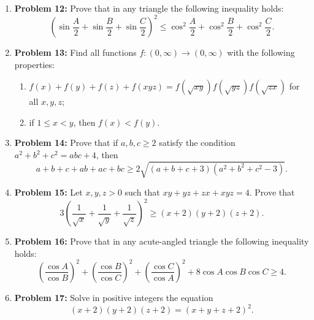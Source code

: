 \documentclass{article}
\begin{document}
\begin{enumerate}
    \vspace{3cm}
    
    \item \textbf{Problem 12:} Prove that in any triangle the following inequality holds:
    \[
    \left( \sin \frac{A}{2} + \sin \frac{B}{2} + \sin \frac{C}{2} \right)^2 \leq \cos^2 \frac{A}{2} + \cos^2 \frac{B}{2} + \cos^2 \frac{C}{2}.
    \]
    
    \vspace{3cm}
    
    \item \textbf{Problem 13:} Find all functions \( f : (0, \infty) \rightarrow (0, \infty) \) with the following properties:
    \begin{enumerate}
        \item \( f(x) + f(y) + f(z) + f(xyz) = f(\sqrt{xy})f(\sqrt{yz})f(\sqrt{zx}) \) for all \( x, y, z \);
        \item if \( 1 \leq x < y \), then \( f(x) < f(y) \).
    \end{enumerate}
    
    \vspace{3cm}
    
    \item \textbf{Problem 14:} Prove that if \( a, b, c \geq 2 \) satisfy the condition \( a^2 + b^2 + c^2 = abc + 4 \), then
    \[
    a + b + c + ab + ac + bc \geq 2\sqrt{(a + b + c + 3)(a^2 + b^2 + c^2 - 3)}.
    \]
    
    \vspace{3cm}
    
    \item \textbf{Problem 15:} Let \( x, y, z > 0 \) such that \( xy + yz + zx + xyz = 4 \). Prove that
    \[
    3 \left( \frac{1}{\sqrt{x}} + \frac{1}{\sqrt{y}} + \frac{1}{\sqrt{z}} \right)^2 \geq (x + 2)(y + 2)(z + 2).
    \]
    
    \vspace{3cm}
    
    \item \textbf{Problem 16:} Prove that in any acute-angled triangle the following inequality holds:
    \[
    \left( \frac{\cos A}{\cos B} \right)^2 + \left( \frac{\cos B}{\cos C} \right)^2 + \left( \frac{\cos C}{\cos A} \right)^2 + 8 \cos A \cos B \cos C \geq 4.
    \]
    
    \vspace{3cm}
    
    \item \textbf{Problem 17:} Solve in positive integers the equation
    \[
    (x + 2)(y + 2)(z + 2) = (x + y + z + 2)^2.
    \]
    

\end{enumerate}
\end{document}
